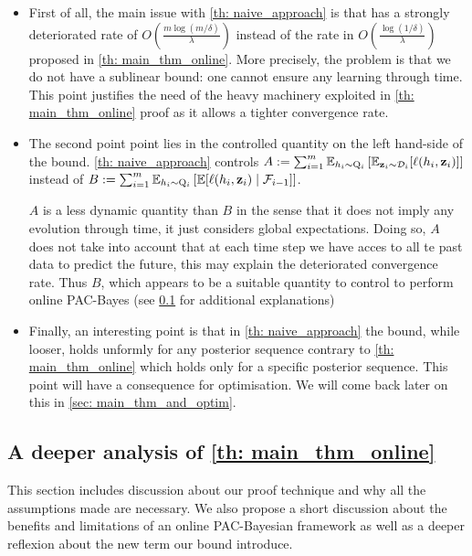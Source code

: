 \begin{noaddcontents}
\begin{itemize}
  \item First of all, the main issue with \cref{th: naive_approach} is that has a strongly deteriorated rate of $O\left(\frac{m\log(m/\delta)}{\lambda} \right)$ instead of the rate in  $O\left(\frac{\log(1/\delta)}{\lambda} \right)$ proposed in \cref{th: main_thm_online}.
  More precisely, the problem is that we do not have a sublinear bound: one cannot ensure any learning through time.
  This point justifies the need of the heavy machinery exploited in \cref{th: main_thm_online} proof as it allows a tighter convergence rate.
  \item The second point point lies in the controlled quantity on the left hand-side of the bound. \cref{th: naive_approach} controls $A:=\sum_{i=1}^m \mathbb{E}_{h_i\sim \mathrm{Q}_{i}}\left[ \mathbb{E}_{\mathbf{z}_i\sim \mathcal{D}_i}[\ell(h_i,\mathbf{z}_i)]    \right]$
  instead of $B:=\sum_{i=1}^m \mathbb{E}_{h_i\sim \mathrm{Q}_{i}}\left[ \mathbb{E}[\ell(h_i,\mathbf{z}_i) \mid \mathcal{F}_{i-1}]    \right]$.

  $A$ is a less dynamic quantity than $B$ in the sense that it does not imply any evolution through time, it just considers global expectations. Doing so, $A$ does not take into account that at each time step we have acces to all te past data to predict the future, this may explain the deteriorated convergence rate. Thus $B$, which appears to be a suitable quantity to control to perform online PAC-Bayes (see \cref{sec: deeper_analysis_main_thm} for additional explanations)

  \item Finally, an interesting point is that in \cref{th: naive_approach} the bound, while looser, holds unformly for any posterior sequence contrary to \cref{th: main_thm_online} which holds only for a specific posterior sequence. This point will have a consequence for optimisation. We will come back later on this in \cref{sec: main_thm_and_optim}.
\end{itemize}




\subsection{A deeper analysis of \cref{th: main_thm_online}}
\label{sec: deeper_analysis_main_thm}

This section includes discussion about our proof technique and why all the assumptions made are necessary. We also propose a short discussion about the benefits and limitations of an online PAC-Bayesian framework as well as a deeper reflexion about the new term our bound introduce.



\end{noaddcontents}
